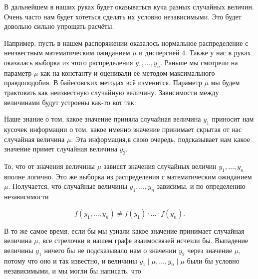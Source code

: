 \documentclass[12pt, a4paper, oneside]{extreport}
\theoremstyle{plain}              %
\theoremstyle{definition}         %
\begin{document}
В дальнейшем в наших руках  будет оказываться куча разных случайных величин. Очень часто нам будет хотеться сделать их условно независимыми. Это будет довольно сильно упрощать расчёты. 

Например, пусть в нашем распоряжении оказалось нормальное распределение с неизвестным математическим ожиданием $\mu$ и дисперсией $4$. Также у нас в руках оказалась выборка из этого распределения   $y_1, \ldots, y_n$.   Раньше мы смотрели на параметр $\mu$ как на константу и оценивали её методом максимального правдоподобия.  В байесовских методах всё изменится. Параметр $\mu$ мы будем трактовать как неизвестную случайную величину. Зависимости между величинами будут устроены как-то вот так:

\begin{center}
\end{center}

Наше знание о том, какое значение приняла случайная величина $y_1$ приносит нам кусочек информации о том, какое именно значение принимает скрытая от нас случайная величина $\mu$. Эта информация,в свою очередь, подсказывает нам какое значение примет случайная величина $y_2$.

То, что от значения величины $\mu$ зависят значения случайных величин $y_1, \ldots, y_n$ вполне логично. Это же выборка из распределения с математическим ожиданием $\mu$. Получается, что случайные величины $y_1, \ldots, y_n$ зависимы, и по определению независимости 

\[f(y_1, \ldots, y_n) \neq f(y_1) \cdot  \ldots \cdot f(y_n).\]

В то же самое время, если бы мы узнали какое значение принимает случайная величина $\mu$, все стрелочки в нашем графе взаимосвязей исчезли бы. Выпадение величины $y_1$ ничего бы не подсказывало нам о значении $y_2$ через значение $\mu$, потому что оно и так известно, и величины $y_1 \mid \mu, \ldots, y_n \mid \mu$ были бы условно независимыми, и мы могли бы написать, что
\end{document}
